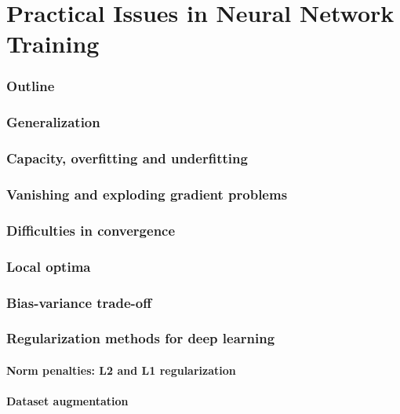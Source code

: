 \renewcommand{\thispart}{5 }
\renewcommand{\thispartname}{Practical Issues in Neural Network Training}

\part{\thispartname}

\section{Outline}




\section{Generalization}


\section{Capacity, overfitting and underfitting}


\section{Vanishing and exploding gradient problems}

\section{Difficulties in convergence}
\section{Local optima}
\section{Bias-variance trade-off}
\section{Regularization methods for deep learning}

\subsection{Norm penalties: L2 and L1 regularization}
\subsection{Dataset augmentation}
